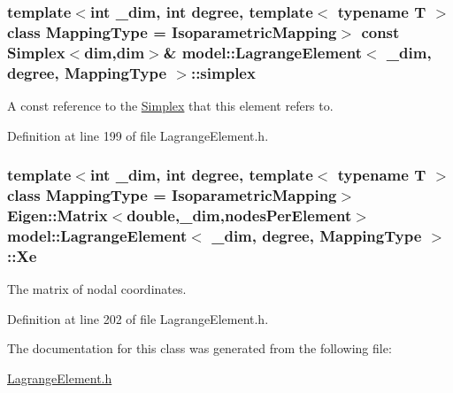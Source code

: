 \subsubsection[{simplex}]{\setlength{\rightskip}{0pt plus 5cm}template$<$int \+\_\+dim, int degree, template$<$ typename T $>$ class Mapping\+Type = Isoparametric\+Mapping$>$ const {\bf Simplex}$<${\bf dim},{\bf dim}$>$\& {\bf model\+::\+Lagrange\+Element}$<$ \+\_\+dim, degree, Mapping\+Type $>$\+::simplex}\label{classmodel_1_1_lagrange_element_add9757431ae75842eabec77a4bf0c525}


A const reference to the \hyperlink{classmodel_1_1_simplex}{Simplex} that this element refers to. 



Definition at line 199 of file Lagrange\+Element.\+h.

\hypertarget{classmodel_1_1_lagrange_element_a498bb72f5edf6e52c95515c8ad1b6f85}{}
\subsubsection[{Xe}]{\setlength{\rightskip}{0pt plus 5cm}template$<$int \+\_\+dim, int degree, template$<$ typename T $>$ class Mapping\+Type = Isoparametric\+Mapping$>$ Eigen\+::\+Matrix$<$double,\+\_\+dim,{\bf nodes\+Per\+Element}$>$ {\bf model\+::\+Lagrange\+Element}$<$ \+\_\+dim, degree, Mapping\+Type $>$\+::Xe}\label{classmodel_1_1_lagrange_element_a498bb72f5edf6e52c95515c8ad1b6f85}


The matrix of nodal coordinates. 



Definition at line 202 of file Lagrange\+Element.\+h.



The documentation for this class was generated from the following file\+:\begin{DoxyCompactItemize}
\item 
\hyperlink{_lagrange_element_8h}{Lagrange\+Element.\+h}\end{DoxyCompactItemize}
